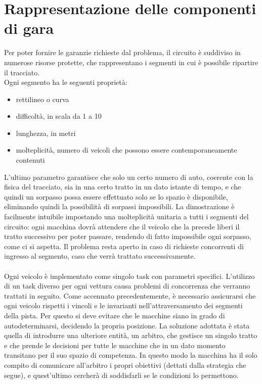 \section{Rappresentazione delle componenti di gara}
Per poter fornire le garanzie richieste dal problema, il circuito è suddiviso in numerose risorse protette, che rappresentano i segmenti in cui è possibile ripartire il tracciato.\\
Ogni segmento ha le seguenti proprietà:
\begin{itemize}
 \item rettilineo o curva
 \item difficoltà, in scala da 1 a 10
 \item lunghezza, in metri
 \item molteplicità, numero di veicoli che possono essere contemporaneamente contenuti
\end{itemize} 
L'ultimo parametro garantisce che solo un certo numero di auto, coerente con la fisica del tracciato, sia in una certo tratto in un dato istante di tempo, e che quindi un sorpasso possa essere effettuato solo se lo spazio è disponibile, eliminando quindi la possibilità di sorpassi impossibili. La dimostrazione è facilmente intuibile impostando una molteplicità unitaria a tutti i segmenti del circuito: ogni macchina dovrà attendere che il veicolo che la precede liberi il tratto successivo per poter passare, rendendo di fatto impossibile ogni sorpasso, come ci si aspetta.
Il problema resta aperto in caso di richieste concorrenti di ingresso al segmento, caso che verrà trattato successivamente.
\\
\\
Ogni veicolo è implementato come singolo task con parametri specifici. L'utilizzo di un task diverso per ogni vettura causa problemi di concorrenza che verranno trattati in seguito. Come accennato precedentemente, è necessario assicurarsi che ogni veicolo rispetti i vincoli e le invarianti nell’attraversamento dei segmenti della pista. Per questo si deve evitare che le macchine siano in grado di autodeterminarsi, decidendo la propria posizione. La soluzione adottata è stata quella di introdurre una ulteriore entità, un arbitro, che gestisce un singolo tratto e che prende le decisioni per tutte le macchine che in un dato momento transitano per il suo spazio di competenza.
In questo modo la macchina ha il solo compito di comunicare all’arbitro i propri obiettivi (dettati dalla strategia che segue), e quest’ultimo cercherà di soddisfarli se le condizioni lo permettono.